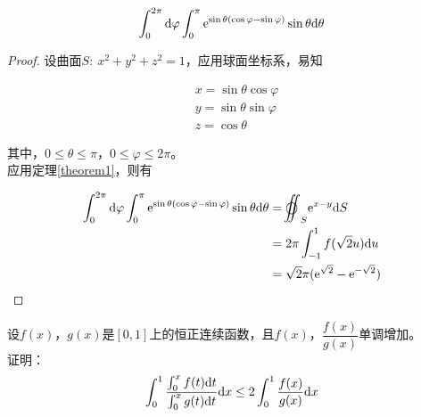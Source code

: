 \begin{proposition}

    $$\int_{0}^{2\pi}\mathrm{d} \varphi \int_{0}^{\pi}{\mathrm{e}^{\sin\theta(\cos\varphi - \sin\varphi)}\sin\theta}\mathrm{d} \theta$$

\end{proposition}

\begin{proof}

    设曲面$S:\ x^2 + y^2 + z^2 = 1$，应用球面坐标系，易知

    \begin{align*}
        &x = \sin\theta \cos\varphi \\
        &y = \sin\theta \sin\varphi \\
        &z = \cos\theta         
    \end{align*}

    其中，$0 \leq \theta \leq \pi$，$0 \leq \varphi \leq 2\pi$。\\
    应用定理\ref{theorem1}，则有

    \begin{align*}
        \int_{0}^{2\pi}\diff \varphi \int_{0}^{\pi}{\euler^{\sin\theta(\cos\varphi - \sin\varphi)}\sin\theta}\diff \theta & =\ooint_{S}{\euler^{x - y}}\diff S \\
        & = 2\pi \int_{-1}^{1}{f(\sqrt{2}u)}\diff u \\
        & = \sqrt{2}\pi(\euler^{\sqrt{2}} - \euler^{-\sqrt{2}})
    \end{align*}

\end{proof}

\begin{proposition}

    设$f(x)$，$g(x)$是$[0,1]$上的恒正连续函数，且$f(x)$，$\dfrac{f(x)}{g(x)}$单调增加。\\
    证明：
    $$\int_{0}^{1}{\dfrac{\int_{0}^{x}{f(t)}\mathrm{d} t}{\int_{0}^{x}{g(t)}\mathrm{d} t}}\mathrm{d} x \leq 2\int_{0}^{1}{\dfrac{f(x)}{g(x)}}\mathrm{d} x$$

\end{proposition}

